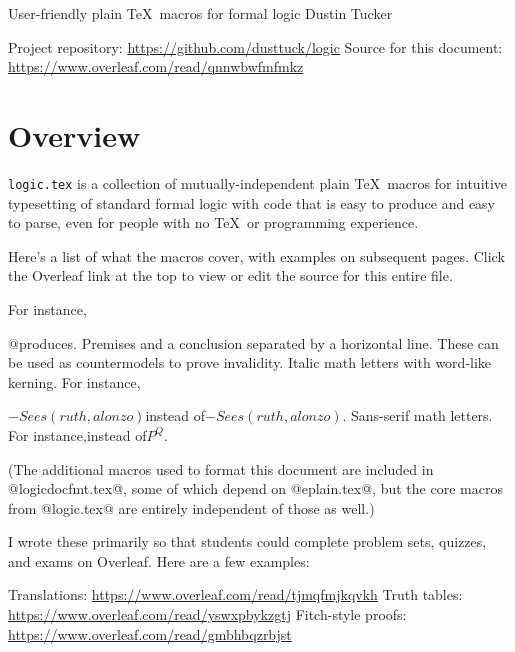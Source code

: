 

\heading
User-friendly plain \TeX\ macros for formal logic
Dustin Tucker
\resetat{}
\strut
Project repository: \url{https://github.com/dusttuck/logic}
Source for this document: \url{https://www.overleaf.com/read/qnnwbwfmfmkz}
\endheading

\section{Overview}

{\tt logic.tex} is a collection of mutually-independent plain \TeX\ macros for intuitive typesetting of standard formal logic with code that is easy to produce and easy to parse, even for people with no \TeX\ or programming experience.

Here's a list of what the macros cover, with examples on subsequent pages. Click the Overleaf link at the top to view or edit the source for this entire file.

\unorderedlist
{} For instance,\logicstrut{0pt}{9.5pt}
\linebreak\strut\hfil@Ax[F(x) > -G(x,a)]@\qquad produces.
 Premises and a conclusion separated by a horizontal line.
 These can be used as countermodels to prove invalidity.
\li@{} Italic math letters with word-like kerning. For instance,\logicstrut{0pt}{9.5pt}
\linebreak\strut\hfil{\itmath$-Sees(ruth,alonzo)$}\qquad instead of\qquad$-Sees(ruth,alonzo)$.
\li@{} Sans-serif math letters. For instance,\qquad instead of\qquad$P^Q$.
\endunorderedlist

(The additional macros used to format this document are included in @logicdocfmt.tex@, some of which depend on @eplain.tex@, but the core macros from @logic.tex@ are entirely independent of those as well.)

I wrote these primarily so that students could complete problem sets, quizzes, and exams on Overleaf. Here are a few examples:

\unorderedlist\interitemskipamount=6pt
\li Translations: \url{https://www.overleaf.com/read/tjmqfmjkqvkh}
\li Truth tables: \url{https://www.overleaf.com/read/yswxpbykzgtj}
\li Fitch-style proofs: \url{https://www.overleaf.com/read/gmbhbqzrbjst}
\endunorderedlist


